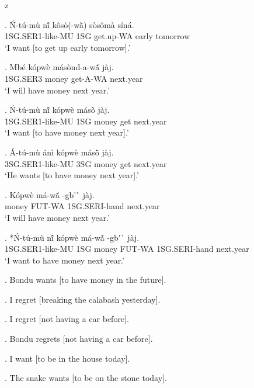 z   \documentclass{assets/fieldnotes}
\begin{document}

\exg. \'{N}-t\'{u}-m\`{u} nĩ́ k\^{o}s\`{o}(-wã̀) s\`{o}s\^{o}m\`{a} s\'{i}n\'{a}. \\
1SG.SER1-like-MU 1SG get.up-WA early tomorrow \\
`I want [to get up early tomorrow].' 

\exg. Mb\'{e} k\'{o}pw\`{e} m\'{a}s\`{o}nd-a-wã́ j\`{a}j.  \\
1SG.SER3 money get-A-WA next.year \\
`I will have money next year.'

\exg. \'{N}-t\'{u}-m\`{u} nĩ́ k\'{o}pw\`{e} m\'{a}sõ̀ j\`{a}j.  \\
1SG.SER1-like-MU 1SG money get next.year \\
`I want [to have money next year].' 

\exg. \'{A}-t\'{u}-m\`{u} \'{a}n\`{i} k\'{o}pw\`{e} m\'{a}sõ̀ j\`{a}j.  \\
3SG.SER1-like-MU 3SG money get next.year \\
`He wants [to have money next year].' 

\exg. K\'{o}pw\`{e} m\'{a}-wã́ -gb\'{}\`{} j\`{a}j.  \\
money FUT-WA 1SG.SERI-hand next.year \\
`I will have money next year.'

\exg. *\'{N}-t\'{u}-m\`{u} nĩ́  k\'{o}pw\`{e} m\'{a}-wã́ -gb\'{}\`{} j\`{a}j.  \\
1SG.SER1-like-MU 1SG money FUT-WA 1SG.SERI-hand next.year \\
`I want to have money next year.' 

\ex. Bondu wants [to have money in the future]. 

\ex. I regret [breaking the calabash yesterday]. 

\ex. I regret [not having a car before]. 

\ex. Bondu regrets [not having a car before]. 

\ex. I want [to be in the house today]. 

\ex. The snake wants [to be on the stone today].  
\end{document}
